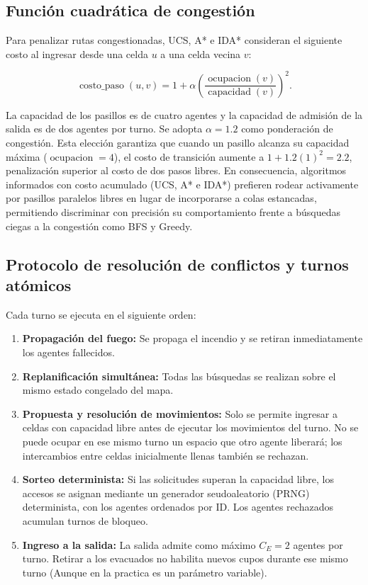 \documentclass[11pt,letterpaper]{article}
\begin{document}
\subsection{Función cuadrática de congestión}

Para penalizar rutas congestionadas, UCS, A* e IDA* consideran el siguiente costo al ingresar desde una celda $u$ a una celda vecina $v$:

\[
\operatorname{costo\_paso}(u,v)
=
1+\alpha\left(
\frac{\operatorname{ocupacion}(v)}
     {\operatorname{capacidad}(v)}
\right)^2.
\]

La capacidad de los pasillos es de cuatro agentes y la capacidad de admisión de la salida es de dos agentes por turno. Se adopta $\alpha = 1.2$ como ponderación de congestión. Esta elección garantiza que cuando un pasillo alcanza su capacidad máxima ($\operatorname{ocupacion}=4$), el costo de transición aumente a $1 + 1.2(1)^2 = 2.2$, penalización superior al costo de dos pasos libres. En consecuencia, algoritmos informados con costo acumulado (UCS, A* e IDA*) prefieren rodear activamente por pasillos paralelos libres en lugar de incorporarse a colas estancadas, permitiendo discriminar con precisión su comportamiento frente a búsquedas ciegas a la congestión como BFS y Greedy.

\subsection{Protocolo de resolución de conflictos y turnos atómicos}

Cada turno se ejecuta en el siguiente orden:

\begin{enumerate}
    \item \textbf{Propagación del fuego:} Se propaga el incendio y se retiran inmediatamente los agentes fallecidos.
    \item \textbf{Replanificación simultánea:} Todas las búsquedas se realizan sobre el mismo estado congelado del mapa.
    \item \textbf{Propuesta y resolución de movimientos:} Solo se permite ingresar a celdas con capacidad libre antes de ejecutar los movimientos del turno. No se puede ocupar en ese mismo turno un espacio que otro agente liberará; los intercambios entre celdas inicialmente llenas también se rechazan.
    \item \textbf{Sorteo determinista:} Si las solicitudes superan la capacidad libre, los accesos se asignan mediante un generador seudoaleatorio (PRNG) determinista, con los agentes ordenados por ID. Los agentes rechazados acumulan turnos de bloqueo.
    \item \textbf{Ingreso a la salida:} La salida admite como máximo $C_E = 2$ agentes por turno. Retirar a los evacuados no habilita nuevos cupos durante ese mismo turno (Aunque en la practica es un parámetro variable).
\end{enumerate}
\end{document}
